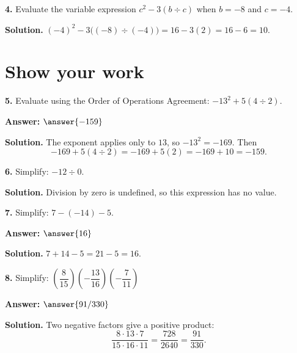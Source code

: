 \documentclass{ximera}
\begin{document}
\begin{problem}

\textbf{4.} Evaluate the variable expression $c^{2}-3(b\div c)$ when $b=-8$ and $c=-4$.

\begin{multipleChoice}
\end{multipleChoice}

\begin{hint}
\textbf{Solution.} $(-4)^{2}-3\bigl((-8)\div(-4)\bigr)=16-3(2)=16-6=10$.
\end{hint}
\end{problem}

\section*{Show your work}

\begin{problem}

\textbf{5.} Evaluate using the Order of Operations Agreement: $-13^{2}+5(4\div 2)$.

\textbf{Answer:} $\answer{-159}$

\begin{hint}
\textbf{Solution.} The exponent applies only to $13$, so $-13^{2}=-169$. Then
\[
  -169+5(4\div 2)=-169+5(2)=-169+10=-159 .
\]
\end{hint}
\end{problem}

\begin{problem}

\textbf{6.} Simplify: $-12\div 0$.

\begin{hint}
\textbf{Solution.} Division by zero is undefined, so this expression has no value.
\end{hint}
\end{problem}

\begin{problem}

\textbf{7.} Simplify: $7-(-14)-5$.

\textbf{Answer:} $\answer{16}$

\begin{hint}
\textbf{Solution.} $7+14-5=21-5=16$.
\end{hint}
\end{problem}

\begin{problem}

\textbf{8.} Simplify: $\left(\dfrac{8}{15}\right)\left(-\dfrac{13}{16}\right)\left(-\dfrac{7}{11}\right)$

\textbf{Answer:} $\answer{91/330}$

\begin{hint}
\textbf{Solution.} Two negative factors give a positive product:
\[
  \frac{8\cdot 13\cdot 7}{15\cdot 16\cdot 11}=\frac{728}{2640}=\frac{91}{330}.
\]
\end{hint}
\end{problem}
\end{document}
